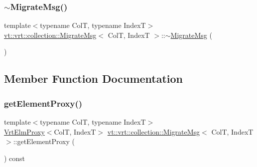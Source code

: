 \mbox{\label{structvt_1_1vrt_1_1collection_1_1_migrate_msg_a67874e771516da55d7509353dfa3a249}} 
\subsubsection{\texorpdfstring{$\sim$\+Migrate\+Msg()}{~MigrateMsg()}}
{\footnotesize\ttfamily template$<$typename ColT, typename IndexT$>$ \\
\hyperlink{structvt_1_1vrt_1_1collection_1_1_migrate_msg}{vt\+::vrt\+::collection\+::\+Migrate\+Msg}$<$ ColT, IndexT $>$\+::$\sim$\hyperlink{structvt_1_1vrt_1_1collection_1_1_migrate_msg}{Migrate\+Msg} (\begin{DoxyParamCaption}{ }\end{DoxyParamCaption})\hspace{0.3cm}{\ttfamily [inline]}}



\subsection{Member Function Documentation}
\mbox{\label{structvt_1_1vrt_1_1collection_1_1_migrate_msg_a6a8d4f819ebe556df1f3533bfa0e21f2}} 
\subsubsection{\texorpdfstring{get\+Element\+Proxy()}{getElementProxy()}}
{\footnotesize\ttfamily template$<$typename ColT, typename IndexT$>$ \\
\hyperlink{structvt_1_1vrt_1_1collection_1_1_vrt_elm_proxy}{Vrt\+Elm\+Proxy}$<$ColT, IndexT$>$ \hyperlink{structvt_1_1vrt_1_1collection_1_1_migrate_msg}{vt\+::vrt\+::collection\+::\+Migrate\+Msg}$<$ ColT, IndexT $>$\+::get\+Element\+Proxy (\begin{DoxyParamCaption}{ }\end{DoxyParamCaption}) const\hspace{0.3cm}{\ttfamily [inline]}}

